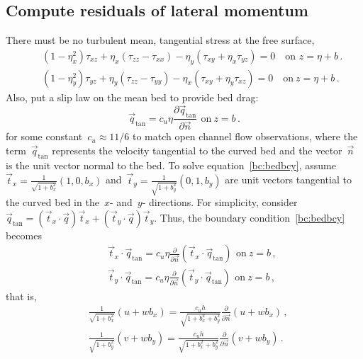 \documentclass[12pt,a5paper]{article}
\begin{document}
\subsection{Compute residuals of lateral momentum}

There must be no turbulent mean, tangential stress at the free surface,
\begin{eqnarray}&&
    (1-\eta_x^2)\tau_{xz}+\eta_x(\tau_{zz}-\tau_{xx})-\eta_y(\tau_{xy}+\eta_x\tau_{yz})=0
    \quad\text{on } z=\eta+b\,.
    \label{bc:ttx} \\&&
    (1-\eta_y^2)\tau_{yz}+\eta_y(\tau_{zz}-\tau_{yy})
    -\eta_x(\tau_{xy}+\eta_y\tau_{xz})=0
    \quad\text{on}\ z=\eta+b\,.
    \label{bc:tty}
\end{eqnarray}
Also, put a slip law on the mean bed to provide bed drag: 
\begin{equation}
\vec q_{\text{tan}}=c_u\eta\frac{\partial\vec q_{\text{tan}}}{\partial\vec n}\,\ \text{on}\ z=b\,.
\label{bc:bedbcy}
\end{equation} 
for some constant~$c_u\approx 11/6$ to match open channel flow observations, where the term~$\vec q_{\text{tan}}$ represents the velocity tangential to the curved bed and the vector~$\vec n$ is the unit vector normal to the bed. To solve equation~\eqref{bc:bedbcy}, assume~$\vec t_x=\frac{1}{\sqrt{1+b_x^2}}(1,0,b_x)$ and~$\vec t_y=\frac{1}{\sqrt{1+b_y^2}}(0,1,b_y)$ are unit vectors tangential to the curved bed in the~$x$- and~$y$- directions. For simplicity, consider~$\vec q_{\text{tan}}=(\vec t_x\cdot\vec q)\vec t_x+(\vec t_y\cdot\vec q)\vec t_y$. Thus, the boundary condition~\eqref{bc:bedbcy} becomes
\begin{eqnarray*}
&&\vec t_x\cdot\vec q_{\text{tan}}=c_u\eta\frac{\partial}{\partial\vec n}(\vec t_x\cdot\vec q_{\text{tan}})\,\ \text{on}\ z=b\,,\\
&&\vec t_y\cdot\vec q_{\text{tan}}=c_u\eta\frac{\partial}{\partial\vec n}(\vec t_y\cdot\vec q_{\text{tan}})\,\ \text{on}\ z=b\,,
\end{eqnarray*}
that is,
\begin{align}&
\frac{1}{\sqrt{1+b_x^2}}(u+wb_x)=\frac{c_uh}{\sqrt{1+b_x^2+b_y^2}}\frac{\partial}{\partial\vec n}(u+wb_x)\,,\label{slip:u}\\&
\frac{1}{\sqrt{1+b_y^2}}(v+wb_y)=\frac{c_uh}{\sqrt{1+b_x^2+b_y^2}}\frac{\partial}{\partial\vec n}(v+wb_y)\,.\label{slip:v}
\end{align}
\end{document}
